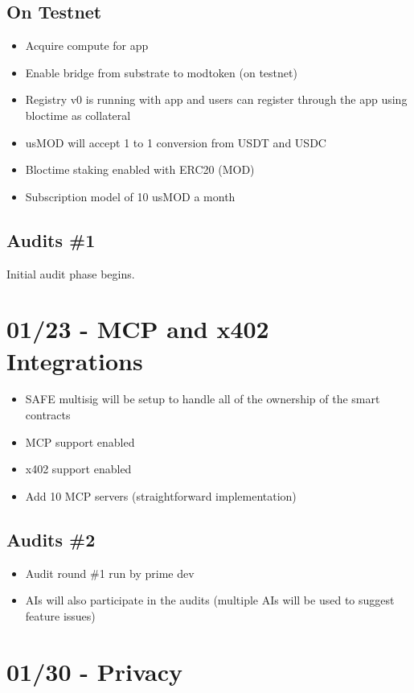 \documentclass{article}
\begin{document}
\subsection{On Testnet}
\begin{itemize}[leftmargin=*]
    \item Acquire compute for app
    \item Enable bridge from substrate to modtoken (on testnet)
    \item Registry v0 is running with app and users can register through the app using bloctime as collateral
    \item usMOD will accept 1 to 1 conversion from USDT and USDC
    \item Bloctime staking enabled with ERC20 (MOD)
    \item Subscription model of 10 usMOD a month
\end{itemize}

\subsection{Audits \#1}
Initial audit phase begins.

\section{01/23 - MCP and x402 Integrations}

\begin{itemize}[leftmargin=*]
    \item SAFE multisig will be setup to handle all of the ownership of the smart contracts
    \item MCP support enabled
    \item x402 support enabled
    \item Add 10 MCP servers (straightforward implementation)
\end{itemize}

\subsection{Audits \#2}
\begin{itemize}[leftmargin=*]
    \item Audit round \#1 run by prime dev
    \item AIs will also participate in the audits (multiple AIs will be used to suggest feature issues)
\end{itemize}

\section{01/30 - Privacy}
\end{document}
